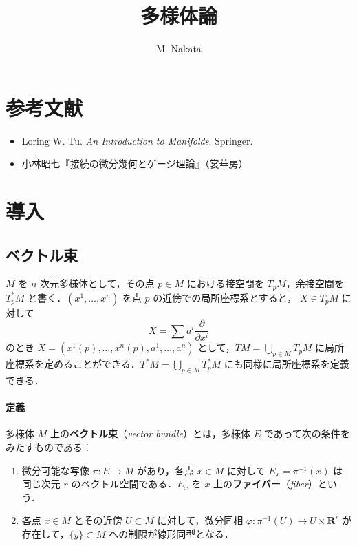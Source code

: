 \documentclass[10pt,b5paper,pandoc]{bxjsarticle}
\title{多様体論}
\author{M. Nakata}
\date{}
\providecommand{\tightlist}{%
  \setlength{\itemsep}{0pt}\setlength{\parskip}{0pt}}
\let\oldparagraph\paragraph
\renewcommand{\paragraph}[1]{\oldparagraph{#1}\mbox{}}
\begin{document}
\maketitle

{
\setcounter{tocdepth}{3}
\tableofcontents
}
\hypertarget{ux53c2ux8003ux6587ux732e}{%
\section{参考文献}\label{ux53c2ux8003ux6587ux732e}}

\begin{itemize}
\tightlist
\item
  Loring W. Tu. \emph{An Introduction to Manifolds}. Springer.
\item
  小林昭七『接続の微分幾何とゲージ理論』（裳華房）
\end{itemize}

\hypertarget{ux5c0eux5165}{%
\section{導入}\label{ux5c0eux5165}}

\hypertarget{ux30d9ux30afux30c8ux30ebux675f}{%
\subsection{ベクトル束}\label{ux30d9ux30afux30c8ux30ebux675f}}

\(M\) を \(n\) 次元多様体として，その点 \(p \in M\) における接空間を
\(T_pM\)，余接空間を \(T^*_p M\) と書く．\((x^1, \dotsc, x^n)\) を点
\(p\) の近傍での局所座標系とすると， \(X \in T_pM\) に対して \[
X = \sum a^i \frac{\partial }{\partial x^i}
\] のとき \(X = (x^1(p), \dotsc, x^n(p), a^1, \dotsc, a^n)\)
として，\(TM = \bigcup_{p \in M} T_pM\)
に局所座標系を定めることができる．\(T^*M = \bigcup_{p \in M} T^*_p M\)
にも同様に局所座標系を定義できる．

\hypertarget{ux5b9aux7fa9}{%
\paragraph{定義}\label{ux5b9aux7fa9}}

多様体 \(M\) 上の\textbf{ベクトル束}（\emph{vector bundle}）とは，多様体
\(E\) であって次の条件をみたすものである：

\begin{enumerate}
\def\labelenumi{\roman{enumi})}
\tightlist
\item
  微分可能な写像 \(\pi \colon E \to M\) があり，各点 \(x \in M\)
  に対して \(E_x = \pi^{-1}(x)\) は同じ次元 \(r\)
  のベクトル空間である．\(E_x\) を \(x\)
  上の\textbf{ファイバー}（\emph{fiber}）という．
\item
  各点 \(x \in M\) とその近傍 \(U \subset M\) に対して，微分同相
  \(\varphi \colon \pi^{-1}(U) \to U \times \boldsymbol{R}^r\)
  が存在して，\(\{ y \} \subset M\) への制限が線形同型となる．
\end{enumerate}
\end{document}
